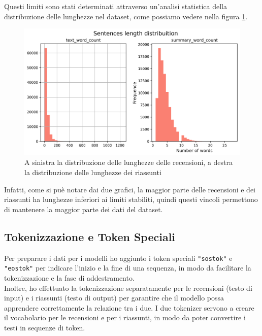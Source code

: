 Questi limiti sono stati determinati attraverso un'analisi statistica della distribuzione delle lunghezze nel dataset, come possiamo vedere nella figura \ref{fig:dataset_length_distribuition}.
\begin{figure}[H]
    \centering
    \includegraphics[width=1\textwidth]{media/dataset_length_distribuition.png}
    \caption{A sinistra la distribuzione delle lunghezze delle recensioni, a destra la distribuzione delle lunghezze dei riassunti}
    \label{fig:dataset_length_distribuition}
\end{figure}
Infatti, come si puè notare dai due grafici, la maggior parte delle recensioni e dei riassunti ha lunghezze inferiori ai limiti stabiliti, quindi questi vincoli permettono di mantenere la maggior parte dei dati del dataset.

\subsection{Tokenizzazione e Token Speciali}
Per preparare i dati per i modelli ho aggiunto i token speciali \texttt{"sostok"} e \texttt{"eostok"} per indicare l'inizio e la fine di una sequenza, in modo da facilitare la tokenizzazione e la fase di addestramento.\\
Inoltre, ho effettuato la tokenizzazione separatamente per le recensioni (testo di input) e i riassunti (testo di output) per garantire che il modello possa apprendere correttamente la relazione tra i due.
I due tokenizer servono a creare il vocabolario per le recensioni e per i riassunti, in modo da poter convertire i testi in sequenze di token.
